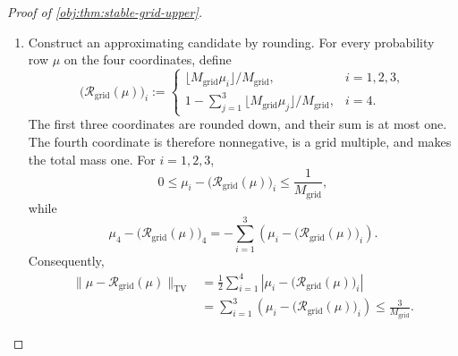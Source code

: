 \begin{proof}[Proof of \cref{obj:thm:stable-grid-upper}]
\begin{enumerate}
Write the selected quantities as in \cref{obj:def:stable-grid-estimator}:
\[
(\nu_*,R_*,r_*)\in\mathcal C_{M_{\mathrm{grid}}},
\qquad
P_*:=P(R_*),
\qquad
\widehat\theta_T=\pi(P_*)r_*.
\]
The experiment's class conditions give a row-stochastic \(P_e\), probability rows \(d_b,d_e\), and a unit-range reward vector:
\[
P_e(i,j)\ge0,\quad \sum_jP_e(i,j)=1,
\qquad
d_b(i),d_e(i)\ge0,\quad \sum_id_b(i)=\sum_id_e(i)=1,
\]
\[
d_eP_e=d_e,
\qquad
0\le r_e(i)\le1.
\]
Applying \cref{obj:ass:target-contraction} to point masses gives
\[
\delta(P_e)
=
\max_{i,j}\frac12\sum_s|P_e(i,s)-P_e(j,s)|
\le\alpha.
\]
Together with \(\theta=d_er_e\) from \cref{obj:def:target-value}, these facts discharge the hypotheses of \cref{obj:lem:pair-polynomial-modulus}. Its value bound is
\[
\begin{aligned}
|\widehat\theta_T-\theta|
&\le
B_\alpha
\max_{0\le k\le6}
|\nu_*P_*^kr_*-d_bP_e^kr_e|\\
&=
B_\alpha
\max_{0\le k\le6}
|\nu_*P_*^kr_*-m_k|.
\end{aligned}
\]

\item Construct an approximating candidate by rounding. For every probability row \(\mu\) on the four coordinates, define
\[
\bigl(\mathcal R_{\mathrm{grid}}(\mu)\bigr)_i
:=
\begin{cases}
\lfloor M_{\mathrm{grid}}\mu_i\rfloor/M_{\mathrm{grid}},
 &i=1,2,3,\\[2mm]
1-\displaystyle\sum_{j=1}^{3}
 \lfloor M_{\mathrm{grid}}\mu_j\rfloor/M_{\mathrm{grid}},
 &i=4.
\end{cases}
\]
The first three coordinates are rounded down, and their sum is at most one. The fourth coordinate is therefore nonnegative, is a grid multiple, and makes the total mass one. For \(i=1,2,3\),
\[
0\le
\mu_i-\bigl(\mathcal R_{\mathrm{grid}}(\mu)\bigr)_i
\le\frac1{M_{\mathrm{grid}}},
\]
while
\[
\mu_4-\bigl(\mathcal R_{\mathrm{grid}}(\mu)\bigr)_4
=
-\sum_{i=1}^{3}
 \left(\mu_i-\bigl(\mathcal R_{\mathrm{grid}}(\mu)\bigr)_i\right).
\]
Consequently,
\[
\begin{aligned}
\|\mu-\mathcal R_{\mathrm{grid}}(\mu)\|_{\mathrm{TV}}
&=
\frac12\sum_{i=1}^{4}
 \left|\mu_i-\bigl(\mathcal R_{\mathrm{grid}}(\mu)\bigr)_i\right|\\
&=
\sum_{i=1}^{3}
 \left(\mu_i-\bigl(\mathcal R_{\mathrm{grid}}(\mu)\bigr)_i\right)
\le\frac3{M_{\mathrm{grid}}}.
\end{aligned}
\]


\end{enumerate}
\end{proof}
